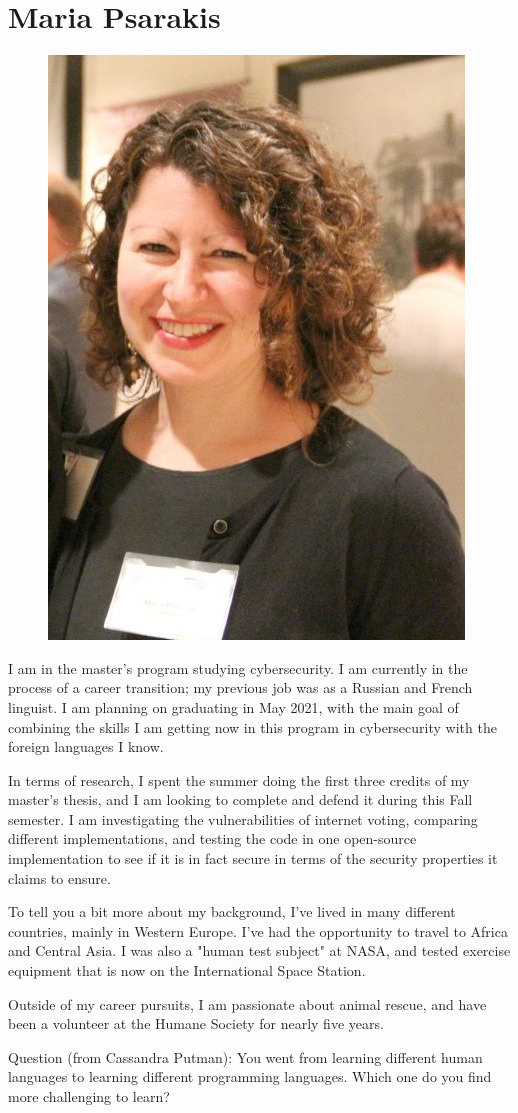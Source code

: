 \section{Maria Psarakis}
\begin{figure}
    \centering
    \includegraphics[scale=0.5]{mpsaraki.jpg}
\end{figure}

I am in the master's program studying cybersecurity. I am currently in the process of a career transition; my previous job was as a Russian and French linguist. I am planning on graduating in May 2021, with the main goal of combining the skills I am getting now in this program in cybersecurity with the foreign languages I know.

In terms of research, I spent the summer doing the first three credits of my master's thesis, and I am looking to complete and defend it during this Fall semester. I am investigating the vulnerabilities of internet voting, comparing different implementations, and testing the code in one open-source implementation to see if it is in fact secure in terms of the security properties it claims to ensure.

To tell you a bit more about my background, I've lived in many different countries, mainly in Western Europe. I've had the opportunity to travel to Africa and Central Asia. I was also a "human test subject" at NASA, and tested exercise equipment that is now on the International Space Station.

Outside of my career pursuits, I am passionate about animal rescue, and have been a volunteer at the Humane Society for nearly five years.

Question (from Cassandra Putman): You went from learning different human languages to learning different programming languages.  Which one do you find more challenging to learn? 
